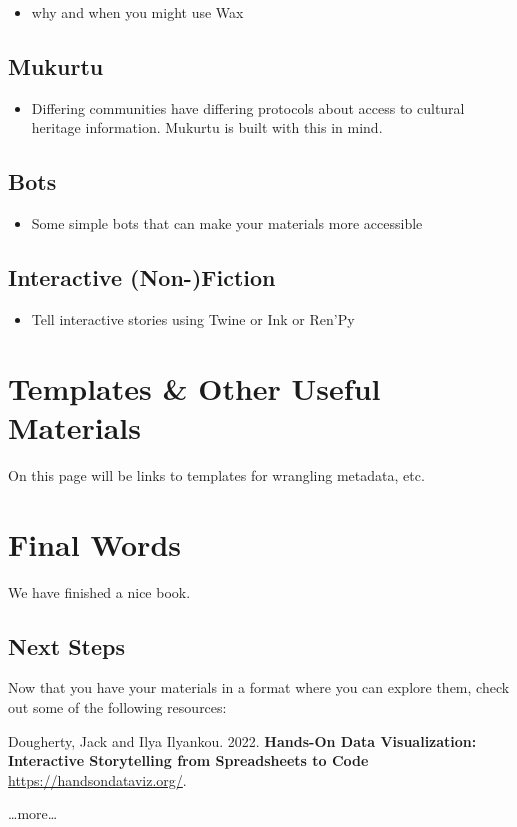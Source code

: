 \documentclass[
]{book}
\providecommand{\tightlist}{%
  \setlength{\itemsep}{0pt}\setlength{\parskip}{0pt}}
\begin{document}
\begin{itemize}
\tightlist
\item
  why and when you might use Wax
\end{itemize}

\hypertarget{mukurtu}{%
\section{Mukurtu}\label{mukurtu}}

\begin{itemize}
\tightlist
\item
  Differing communities have differing protocols about access to cultural heritage information. Mukurtu is built with this in mind.
\end{itemize}

\hypertarget{bots}{%
\section{Bots}\label{bots}}

\begin{itemize}
\tightlist
\item
  Some simple bots that can make your materials more accessible
\end{itemize}

\hypertarget{interactive-stories}{%
\section{Interactive (Non-)Fiction}\label{interactive-stories}}

\begin{itemize}
\tightlist
\item
  Tell interactive stories using Twine or Ink or Ren'Py
\end{itemize}

\hypertarget{templates}{%
\chapter{Templates \& Other Useful Materials}\label{templates}}

On this page will be links to templates for wrangling metadata, etc.

\hypertarget{final-words}{%
\chapter{Final Words}\label{final-words}}

We have finished a nice book.

\hypertarget{next-steps}{%
\section{Next Steps}\label{next-steps}}

Now that you have your materials in a format where you can explore them, check out some of the following resources:

Dougherty, Jack and Ilya Ilyankou. 2022. \textbf{Hands-On Data Visualization: Interactive Storytelling from Spreadsheets to Code} \url{https://handsondataviz.org/}.

\ldots more\ldots{}

  
\end{document}
